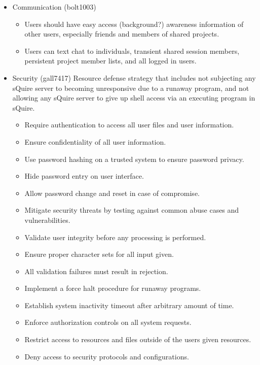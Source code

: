 \documentclass[11pt]{report}
\begin{document}
\begin{itemize}
        \item Communication (bolt1003) \begin{itemize}
            \item Users should have easy access (background?) awareness information of other users, especially friends and members of shared projects.
            \item Users can text chat to individuals, transient shared session members, persistent project member lists, and all logged in users. \end{itemize}
        \item Security (gall7417) 
        Resource defense strategy that includes not subjecting any sQuire server to becoming unresponsive due to a runaway program, and not allowing any sQuire server to give up shell access via an executing program in sQuire. \begin{itemize}
            \item Require authentication to access all user files and user information.
            \item Ensure confidentiality of all user information.
            \item Use password hashing on a trusted system to ensure password privacy.
            \item Hide password entry on user interface.
            \item Allow password change and reset in case of compromise.
            \item Mitigate security threats by testing against common abuse cases and vulnerabilities.
            \item Validate user integrity before any processing is performed.
            \item Ensure proper character sets for all input given.
            \item All validation failures must result in rejection.
            \item Implement a force halt procedure for runaway programs.
            \item Establish system inactivity timeout after arbitrary amount of time.
            \item Enforce authorization controls on all system requests.
            \item Restrict access to resources and files outside of the users given resources.
            \item Deny access to security protocols and configurations.\end{itemize}

\end{itemize}
\end{document}
